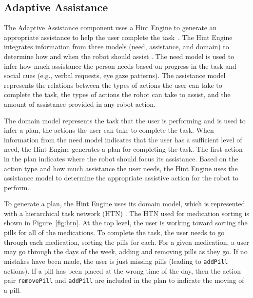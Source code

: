 \documentclass[letterpaper]{article} %
\begin{document}
\subsection{Adaptive Assistance}

The Adaptive Assistance component uses a Hint Engine to generate an appropriate assistance to help the user complete the task~\cite{wilson2018general}.  The Hint Engine integrates information from three models (need, assistance, and domain) to determine how and when the robot should assist \cite{wilson2019developing}.  The need model is used to infer how much assistance the person needs based on progress in the task and social cues (e.g., verbal requests, eye gaze patterns).  The assistance model represents the relations between the types of actions the user can take to complete the task, the types of actions the robot can take to assist, and the amount of assistance provided in any robot action.

The domain model represents the task that the user is performing and is used to infer a plan, the actions the user can take to complete the task.  When information from the need model indicates that the user has a sufficient level of need, the Hint Engine generates a plan for completing the task.  The first action in the plan indicates where the robot should focus its assistance.  Based on the action type and how much assistance the user needs, the Hint Engine uses the assistance model to determine the appropriate assistive action for the robot to perform.

To generate a plan, the Hint Engine uses its domain model, which is represented with a hierarchical task network (HTN) \cite{nau1999shop}.  The HTN used for medication sorting is shown in Figure~\ref{fig:htn}.  At the top level, the user is working toward sorting the pills for all of the medications.  To complete the task, the user needs to go through each medication, sorting the pills for each. For a given medication, a user may go through the days of the week, adding and removing pills as they go.  If no mistakes have been made, the user is just missing pills (leading to \texttt{addPill} actions).  If a pill has been placed at the wrong time of the day, then the action pair \texttt{removePill} and \texttt{addPill} are included in the plan to indicate the moving of a pill.
\end{document}
